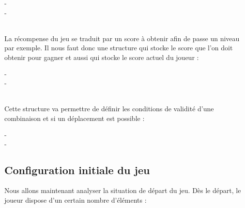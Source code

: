   \begin{typeag}[Joueur]
 -       \\
 -       
  \end{typeag}	\\
  
  La récompense du jeu se traduit par un score à obtenir afin de passe un niveau par exemple.
  Il nous faut donc une structure qui stocke le score que l'on doit obtenir pour gagner et aussi qui stocke le score actuel du joueur : \\
  
  \begin{typeag}[Score]
 -       \\
 -       
  \end{typeag}	\\
  
  Cette structure va permettre de définir les conditions de validité d'une combinaison et si un déplacement est possible : \\
  
\begin{typeag}[Case]
 -       \\
 -       
  \end{typeag}

\subsection{Configuration initiale du jeu}
Nous allons maintenant analyser la situation de départ du jeu. Dès le départ, le joueur dispose d'un certain nombre d'éléments : \\

